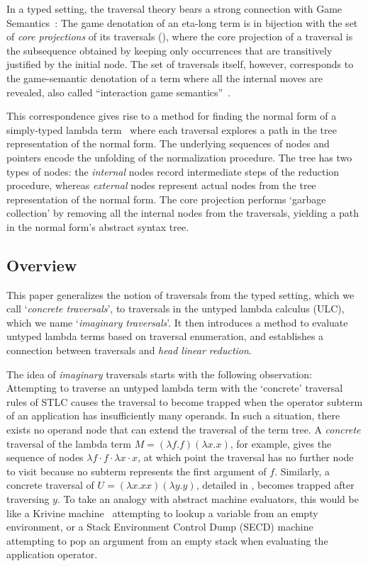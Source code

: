 \documentclass[xchauthor,chkrefs,GCNS,amsmath,amsthm,rotating,leaveRGB]{tcsg}
\theoremstyle{plain}
\theoremstyle{definition}
\begin{document}
In a typed setting, the traversal theory bears a strong connection with
Game Semantics~\cite{BlumPhd}: The game denotation of an eta-long term is in
bijection with the set of \emph{core projections} of its traversals
(), where the core
projection of a traversal is the subsequence obtained by keeping only
occurrences that are transitively justified by the initial node. The set of
traversals itself, however, corresponds to the game-semantic
denotation of a term where all the internal moves are revealed, also called
``interaction game semantics''~\cite{BlumPhd}.

This correspondence gives rise to a method for finding the normal form of a
simply-typed lambda term~\cite{BlumPhd,BlumGalop2008,Blum-LocalBeta2008}
where each traversal explores a path in the tree representation of the normal
form. The underlying sequences of nodes and pointers encode the unfolding of
the normalization procedure. The tree has two types of nodes: the
\emph{internal} nodes record intermediate steps of the reduction procedure,
whereas \emph{external} nodes represent actual nodes from the tree
representation of the normal form. The core projection performs `garbage
collection' by removing all the internal nodes from the traversals,  yielding
a path in the normal form's abstract syntax tree.


\subsection{Overview}\label{sec1.2}

This paper generalizes the notion of traversals from the typed setting, which
we call `\emph{concrete traversals}', to traversals in the untyped lambda calculus (ULC),
which we name `\emph{imaginary traversals}'. It then introduces a method to
evaluate untyped lambda terms based on traversal enumeration, and
establishes a connection between traversals and \emph{head linear reduction}.

The idea of \emph{imaginary} traversals starts with the following
observation: Attempting to traverse an untyped lambda term with the
`concrete' traversal rules of STLC causes the traversal to become trapped when the
operator subterm of an application has insufficiently many operands. In such
a situation, there exists no operand node that can extend the traversal of the term tree. A
\emph{concrete} traversal of the lambda term $M = (\lambda f.f)(\lambda
x.x)$, for example, gives the sequence of nodes $\lambda f \cdot f \cdot
\lambda x \cdot x$, at which point the traversal has no further node to visit because
no subterm represents the first argument of $f$. Similarly, a
concrete traversal of $U = (\lambda x. x x)(\lambda y. y)$, detailed in
, becomes trapped after traversing $y$. To take
an analogy with abstract machine evaluators, this would be like a Krivine
machine~\cite{Krivine2007} attempting to lookup a variable from an empty
environment, or a Stack Environment Control Dump (SECD) machine~\cite{landin-secd} attempting to pop an
argument from an empty stack when evaluating the application operator.
\end{document}
